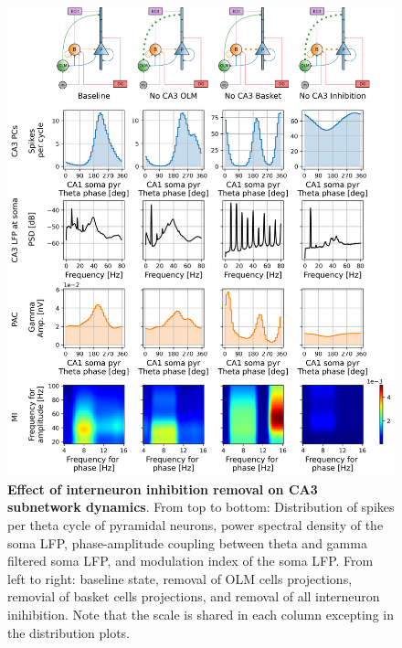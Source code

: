 \documentclass[../main.tex]{subfiles}
\begin{document}
\begin{figure}[htbp]
    \centering
    \includegraphics[width=\textwidth]{chapter4/figures/removing_interneurons/removing_interneurons_ca3_lfp.png}
    \caption{\textbf{Effect of interneuron inhibition removal on CA3 subnetwork dynamics}.
    From top to bottom: Distribution of spikes per theta cycle of pyramidal neurons, power spectral density of the soma LFP, phase-amplitude coupling between theta and gamma filtered soma LFP, and modulation index of the soma LFP. 
    From left to right: baseline state, removal of OLM cells projections, removial of basket cells projections, and removal of all interneuron inihibition.
    Note that the scale is shared in each column excepting in the distribution plots.}
    \label{fig:no-inhibition-ca3}
\end{figure}
\end{document}
